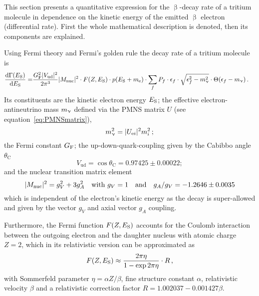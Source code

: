 This section presents a quantitative expression for the $\upbeta$-decay rate of a tritium molecule in dependence on the kinetic energy of the emitted $\upbeta$ electron (differential rate). First the whole mathematical description is denoted, then its components are explained.

Using Fermi theory and Fermi's golden rule the decay rate of a tritium molecule is~\cite{Kleesiek2019,Otten:2008zz} 
\begin{align}
\label{eq:intSpecModelDiffSpec}
\frac{\mathop{}\!\mathrm{d}\Gamma(E_\mathrm{S})}{\mathop{}\!\mathrm{d} E_\mathrm{S}} = &
\frac{G_\mathrm{F}^2 \lvert V_\mathrm{ud}\rvert^2}{2 \pi^3}
\lvert M_\mathrm{nuc}\rvert^2 \cdot
F(Z, E_\mathrm{S}) \cdot 
p(E_\mathrm{S}+m_{\mathrm{e}}) \cdot 
\sum_{f} 
	P_f \cdot 
	\epsilon_f \cdot 
	\sqrt{\epsilon_f^2-m_\upnu^2} \cdot 
	\Theta(\epsilon_f-m_\upnu)
	\text{\,.}
\end{align}
Its constituents are the kinetic electron energy $E_\mathrm{S}$;
the effective electron-antineutrino mass $m_\upnu$ defined via the PMNS matrix $U$ (see equation~\ref{eq:PMNSmatrix}),
\begin{equation}
	 m_\upnu^2 = \lvert U_{\mathrm{e} i}\rvert^2 m_i^2\,;
\end{equation}
the Fermi constant $G_\mathrm{F}$;
the up-down-quark-coupling given by the Cabibbo angle $\theta_\mathrm{C}$~\cite{ReviewOfParticlePhysics}
\begin{equation}
V_\mathrm{ud} = \cos \theta_\mathrm{C} = 
0.97425\pm0.00022;
\end{equation}
and the nuclear transition matrix element~\cite{ReviewOfParticlePhysics}
\begin{equation}
\lvert M_\mathrm{nuc}\rvert^2 = g_V^2+3g_A^2 \quad
\text{with } g_V = 1 \quad
\text{and} \quad g_A/g_V = -1.2646 \pm 0.0035
\end{equation}
which is independent of the electron's kinetic energy as the decay is super-allowed and given by the vector $g_V$ and axial vector $g_A$ coupling.

Furthermore, the Fermi function $F(Z,E_\mathrm{S})$ accounts for the Coulomb interaction between the outgoing electron and the daughter nucleus with atomic charge $Z=2$, which in its relativistic version can be approximated as~\cite{Simpson1981}
\begin{equation}
F(Z,E_\mathrm{S}) \approx \frac{2 \pi \eta}{1-\exp{2 \pi \eta}} \cdot R
\text{\,,}
\end{equation}
with Sommerfeld parameter $\eta = \alpha Z / \beta$, fine structure constant $\alpha$, relativistic velocity $\beta$ and a relativistic correction factor $R = 1.002037-0.001427\beta$.

